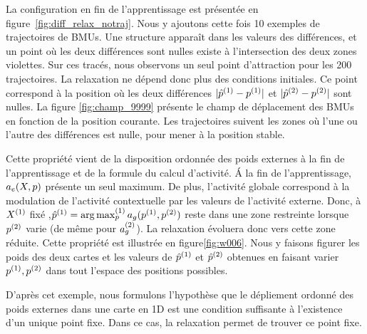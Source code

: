 \documentclass[../main]{subfiles}
\begin{document}
La configuration en fin de l'apprentissage est présentée en figure~\ref{fig:diff_relax_notraj}. Nous y ajoutons cette fois 10 exemples de trajectoires de BMUs.
Une structure apparaît dans les valeurs des différences, et un point où les deux différences sont nulles existe à l'intersection des deux zones violettes.
Sur ces tracés, nous observons un seul point d'attraction pour les 200 trajectoires. La relaxation ne dépend donc plus des conditions initiales.
Ce point correspond à la position où les deux différences $\lvert \hat{p}^{({1})} - p^{({1})} \rvert$ et $\lvert \hat{p}^{({2})} - p^{({2})}\rvert$ sont nulles.
La figure \ref{fig:champ_9999} présente le champ de déplacement des BMUs en fonction de la position courante. Les trajectoires suivent les zones où l'une ou l'autre des différences est nulle, pour mener à la position stable. 


Cette propriété vient de la disposition ordonnée des poids externes à la fin de l'apprentissage et de la formule du calcul d'activité.
\'A la fin de l'apprentissage, $a_e(X,p)$ présente un seul maximum. 
De plus, l'activité globale correspond à la modulation de l'activité contextuelle par les valeurs de l'activité externe. Donc, à $X^{({1})}$ fixé ,$\hat{p}^{({1})} = \operatorname*{arg\,max}_p^{({1})} a_g(p^{({1})}, p^{({2})})$ reste dans une zone restreinte lorsque $p^{({2})}$ varie (de même pour $a_g^{({2})}$). 
La relaxation évoluera donc vers cette zone réduite.
Cette propriété est illustrée en figure\ref{fig:w006}.
Nous y faisons figurer les poids des deux cartes et les valeurs de $\hat{p}^{({1})}$ et $\hat{p}^{({2})}$ obtenues en faisant varier $p^{({1})}, p^{({2})}$ dans tout l'espace des positions possibles.

D'après cet exemple, nous formulons l'hypothèse que le dépliement ordonné des poids externes dans une carte en 1D est une condition suffisante à l'existence d'un unique point fixe. 
Dans ce cas, la relaxation permet de trouver ce point fixe.
\end{document}
